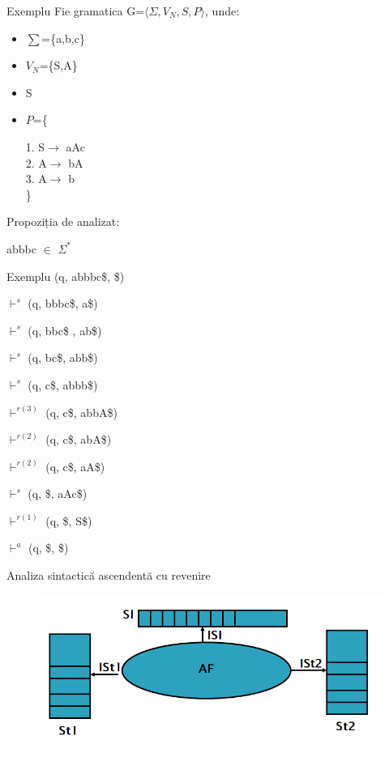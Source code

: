 \documentclass[pdf]{beamer}
\begin{document}
\begin{frame}{Exemplu}
Fie gramatica G=$\langle \Sigma, V_N, S, P \rangle$, unde:

\begin{itemize}
\item
$\sum$=\{a,b,c\}
\item
$V_N$=\{S,A\}
\item
S
\item
$P$=\{

\hspace{1cm} 1. S$\rightarrow$ aAc\\
\hspace{1cm} 2. A$\rightarrow$ bA\\
\hspace{1cm} 3. A$\rightarrow$ b\\
\}
\end{itemize}

Propoziția de analizat:

abbbc $\in$ $\Sigma^{*}$
\end{frame}



\begin{frame}{Exemplu}
(q, abbbc\$, \$) 

$\vdash^{s}$ (q, bbbc\$, a\$)

$\vdash^{s}$ (q, bbc\$  , ab\$)

$\vdash^{s}$ (q, bc\$, abb\$)

$\vdash^{s}$ (q, c\$, abbb\$)

$\vdash^{r(3)}$ (q, c\$, abbA\$)

$\vdash^{r(2)}$ (q, c\$, abA\$)

$\vdash^{r(2)}$ (q, c\$, aA\$)

$\vdash^{s}$ (q, \$, aAc\$)

$\vdash^{r(1)}$ (q, \$, S\$)

$\vdash^{a}$ (q, \$, \$)
\end{frame}



\begin{frame}{Analiza sintactică ascendentă cu revenire}
\begin{figure}
\centering
\includegraphics[scale=0.7]{img/asacr}
\end{figure}
\end{frame}
\end{document}
